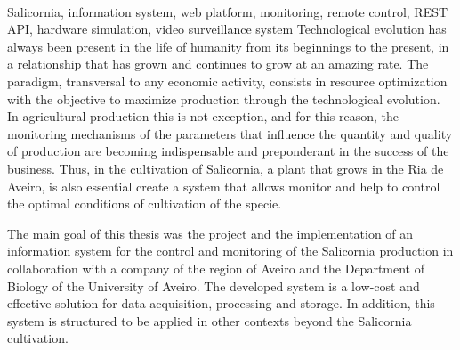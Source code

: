 \documentclass[11pt,twoside,a4paper]{report}
\begin{document}
\EndTitlePage
\titlepage\ \endtitlepage %


\TitlePage
  \vspace*{55mm}
  {Salicornia, information system, web platform, monitoring, remote control, REST API, hardware simulation, video surveillance system}
  \vspace*{5mm}
       {Technological evolution has always been present in the life of humanity from its beginnings to the present, in a relationship that has grown and continues to grow at an amazing rate. The paradigm, transversal to any economic activity, consists in resource optimization with the objective to maximize production through the technological evolution. In agricultural production this is not exception, and for this reason, the monitoring mechanisms of the parameters that influence the quantity and quality of production are becoming indispensable and preponderant in the success of the business. Thus, in the cultivation of Salicornia, a plant that grows in the Ria de Aveiro, is also essential create a system that allows monitor and help to control the optimal conditions of cultivation of the specie.
       	}
       
       
         \TEXT{}
         {The main goal of this thesis was the project and the implementation of an information system for the control and monitoring of the Salicornia production in collaboration with a company of the region of Aveiro and the Department of Biology of the University of Aveiro. The developed system is a low-cost and effective solution for data acquisition, processing and storage. In addition, this system is structured to be applied in other contexts beyond the Salicornia cultivation. }
\EndTitlePage
\titlepage\ \endtitlepage %


%
%


\tableofcontents

\cleardoublepage
{}
\listoffigures



\cleardoublepage
{}
\listoftables




\cleardoublepage

\end{document}
